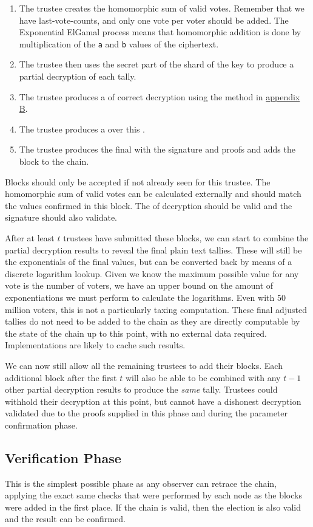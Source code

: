 \begin{enumerate}
    \item The trustee creates the homomorphic sum of valid votes. Remember that we have last-vote-counts, and only one vote per voter should be added. The Exponential ElGamal process means that homomorphic addition is done by multiplication of the \texttt{a} and \texttt{b} values of the ciphertext.
    \item The trustee then uses the secret part of the shard of the key to produce a partial decryption of each tally.
    \item The trustee produces a  of correct decryption using the method in \hyperref[proc:zkp:dec]{appendix B}.
    \item The trustee produces a  over this .
    \item The trustee produces the final  with the signature and proofs and adds the block to the chain.
\end{enumerate}

Blocks should only be accepted if not already seen for this trustee. The homomorphic sum of valid votes can be calculated externally and should match the values confirmed in this block. The  of decryption should be valid and the signature should also validate.

After at least $t$ trustees have submitted these blocks, we can start to combine the partial decryption results to reveal the final plain text tallies. These will still be the exponentials of the final values, but can be converted back by means of a discrete logarithm lookup. Given we know the maximum possible value for any vote is the number of voters, we have an upper bound on the amount of exponentiations we must perform to calculate the logarithms. Even with 50 million voters, this is not a particularly taxing computation. These final adjusted tallies do not need to be added to the chain as they are directly computable by the state of the chain up to this point, with no external data required. Implementations are likely to cache such results.

We can now still allow all the remaining trustees to add their blocks. Each additional block after the first $t$ will also be able to be combined with any $t - 1$ other partial decryption results to produce the \emph{same} tally. Trustees could withhold their decryption at this point, but cannot have a dishonest decryption validated due to the proofs supplied in this phase and during the parameter confirmation phase.


\subsection{Verification Phase}
\label{ch:astris:detail:verify}

This is the simplest possible phase as any observer can retrace the chain, applying the exact same checks that were performed by each node as the blocks were added in the first place. If the chain is valid, then the election is also valid and the result can be confirmed.
